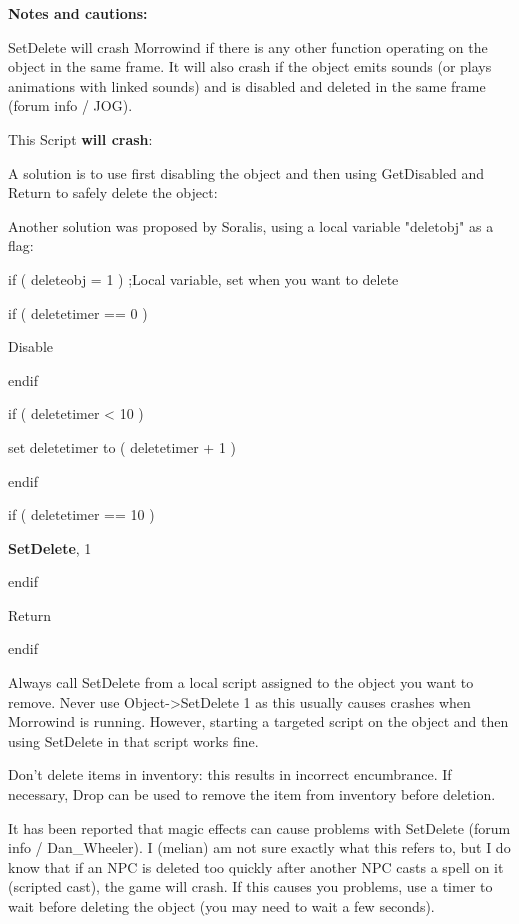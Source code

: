 \documentclass[
]{article}
\begin{document}
\textbf{Notes and cautions:}

SetDelete will crash Morrowind if there is any other function operating
on the object in the same frame. It will also crash if the object emits
sounds (or plays animations with linked sounds) and is disabled and
deleted in the same frame (forum info / JOG).

This Script \textbf{will crash}:



A solution is to use first disabling the object and then using
GetDisabled and Return to safely delete the object:



Another solution was proposed by Soralis, using a local variable
"deletobj" as a flag:

if ( deleteobj = 1 ) ;Local variable, set when you want to delete

if ( deletetimer == 0 )

Disable

endif

if ( deletetimer \textless{} 10 )

set deletetimer to ( deletetimer + 1 )

endif

if ( deletetimer == 10 )

\textbf{SetDelete}, 1

endif

Return

endif

Always call SetDelete from a local script assigned to the object you
want to remove. Never use Object-\textgreater SetDelete 1 as this
usually causes crashes when Morrowind is running. However, starting a
targeted script on the object and then using SetDelete in that script
works fine.

Don't delete items in inventory: this results in incorrect encumbrance.
If necessary, Drop can be used to remove the item from inventory before
deletion.

It has been reported that magic effects can cause problems with
SetDelete (forum info / Dan\_Wheeler). I (melian) am not sure exactly
what this refers to, but I do know that if an NPC is deleted too quickly
after another NPC casts a spell on it (scripted cast), the game will
crash. If this causes you problems, use a timer to wait before deleting
the object (you may need to wait a few seconds).
\end{document}
